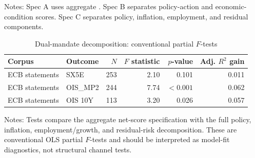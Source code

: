 \begin{table}[H]
\centering
\caption{Dual-mandate decomposition: $R^2$ levels and gains}
\label{tab:a2_dual_levels}
\begin{threeparttable}
\small
{}
\begin{tablenotes}
\footnotesize
\item Notes: Spec A uses aggregate \netscore{}. Spec B separates policy-action and economic-condition scores. Spec C separates policy, inflation, employment, and residual components.
\end{tablenotes}
\end{threeparttable}
\end{table}



\begin{table}[H]
\centering
\caption{Dual-mandate decomposition: conventional partial $F$-tests}
\label{tab:a2_dual_f_tests}
\begin{threeparttable}
\small
\begin{tabular}{llrrrr}
\toprule
Corpus & Outcome & $N$ & $F$ statistic & $p$-value & Adj. $R^2$ gain \\
\midrule
ECB statements & SX5E & 253 & 2.10 & 0.101 & 0.011 \\
ECB statements & OIS\_MP2 & 244 & 7.74 & $<0.001$ & 0.062 \\
ECB statements & OIS 10Y & 113 & 3.20 & 0.026 & 0.057 \\
\bottomrule
\end{tabular}
\begin{tablenotes}[flushleft]
\footnotesize
\item Notes: Tests compare the aggregate net-score specification with the full
policy, inflation, employment/growth, and residual-risk decomposition. These
are conventional OLS partial $F$-tests and should be interpreted as model-fit
diagnostics, not structural channel tests.
\end{tablenotes}
\end{threeparttable}
\end{table}


